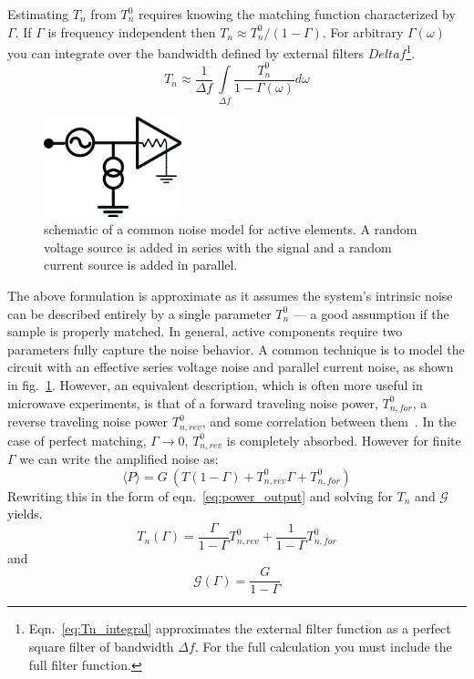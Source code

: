 Estimating $T_n$ from $T_n^0$ requires knowing the matching function characterized by $\Gamma$. If $\Gamma$ is frequency independent then $T_n \approx T_n^0 / (1-\Gamma)$. For arbitrary $\Gamma(\omega)$ you can integrate over the bandwidth defined by external filters $Delta f$\footnote{Eqn.~\ref{eq:Tn_integral} approximates the external filter function as a perfect square filter of bandwidth $\Delta f$. For the full calculation you must include the full filter function.}.
\begin{equation}\label{eq:Tn_integral}
T_n \approx \frac{1}{\Delta f}\ \int\limits_{\Delta f}\frac{T_n^0}{1-\Gamma(\omega)}d\omega
\end{equation}
\begin{figure}
\centering
\includegraphics[width=40mm]{figures/Johnson_noise_thermometry/schematic_noise_IV.png}
\caption{schematic of a common noise model for active elements. A random voltage source is added in series with the signal and a random current source is added in parallel.}
\label{fig:schematic_noise_IV}
\end{figure}

The above formulation is approximate as it assumes the system's intrinsic noise can be described entirely by a single parameter $T_n^0$ --- a good assumption if the sample is properly matched. In general, active components require two parameters fully capture the noise behavior. A common technique is to model the circuit with an effective series voltage noise and parallel current noise, as shown in fig.~\ref{fig:schematic_noise_IV}. However, an equivalent description, which is often more useful in microwave experiments, is that of a forward traveling noise power, $T_{n,for}^0$, a reverse traveling noise power $T_{n,rev}^0$, and some correlation between them~\cite{weinreb's_talk??}. In the case of perfect matching, $\Gamma\rightarrow0$, $T_{n,rev}^0$ is completely absorbed. However for finite $\Gamma$ we can write the amplified noise as:
\begin{equation}\label{eq:P_full}
\langle P\rangle=G\ \left(T(1-\Gamma)+T_{n,rev}^0\Gamma+T_{n,for}^0\right)
\end{equation}
Rewriting this in the form of eqn.~\ref{eq:power_output} and solving for $T_n$ and $\mathcal{G}$ yields.
\begin{equation}\label{eq:Tn_effective_full}
T_n(\Gamma)=\frac{\Gamma}{1-\Gamma}T_{n,rev}^0+\frac{1}{1-\Gamma}T_{n,for}^0
\end{equation}
and
\begin{equation}\label{eq:G_effective_full}
\mathcal{G}(\Gamma)=\frac{G}{1-\Gamma}
\end{equation}

